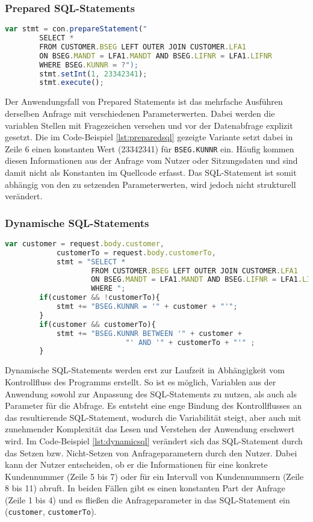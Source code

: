 \subsubsection{Prepared SQL-Statements}

	\begin{lstlisting}[caption={Prepared Statements eingebettet im Quellcode}, label={lst:preparedsql}, language=JavaScript]
		var stmt = con.prepareStatement("
		SELECT *
		FROM CUSTOMER.BSEG LEFT OUTER JOIN CUSTOMER.LFA1
		ON BSEG.MANDT = LFA1.MANDT AND BSEG.LIFNR = LFA1.LIFNR
		WHERE BSEG.KUNNR = ?");
		stmt.setInt(1, 23342341);
		stmt.execute();
	\end{lstlisting}

Der Anwendungsfall von Prepared Statements ist das mehrfache Ausführen derselben Anfrage mit verschiedenen Parameterwerten.
Dabei werden die variablen Stellen mit Fragezeichen versehen und vor der Datenabfrage explizit gesetzt.
Die im Code-Beispiel \ref{lst:preparedsql} gezeigte Variante setzt dabei in Zeile 6 einen konstanten Wert (23342341) für \texttt{BSEG.KUNNR} ein.
Häufig kommen diesen Informationen aus der Anfrage vom Nutzer oder Sitzungsdaten und sind damit nicht als Konstanten im Quellcode erfasst.
Das SQL-Statement ist somit abhängig von den zu setzenden Parameterwerten, wird jedoch nicht strukturell verändert.

\subsubsection{Dynamische SQL-Statements}

	\begin{lstlisting}[caption={Der Kontrollfluss verändert dynamische SQL-Statements}, label={lst:dynamicsql}, language=JavaScript]
		var customer = request.body.customer,
		    customerTo = request.body.customerTo,
		    stmt = "SELECT *
					FROM CUSTOMER.BSEG LEFT OUTER JOIN CUSTOMER.LFA1
					ON BSEG.MANDT = LFA1.MANDT AND BSEG.LIFNR = LFA1.LIFNR
					WHERE ";
		if(customer && !customerTo){
			stmt += "BSEG.KUNNR = '" + customer + "'";
		}
		if(customer && customerTo){
			stmt += "BSEG.KUNNR BETWEEN '" + customer +
							"' AND '" + customerTo + "'" ;
		}
	\end{lstlisting}

Dynamische SQL-Statements werden erst zur Laufzeit in Abhängigkeit vom Kontrollfluss des Programms erstellt.
So ist es möglich, Variablen aus der Anwendung sowohl zur Anpassung des SQL-Statements zu nutzen, als auch als Parameter für die Abfrage.
Es entsteht eine enge Bindung des Kontrollflusses an das resultierende SQL-Statement, wodurch die Variabilität steigt, aber auch mit zunehmender Komplexität das Lesen und Verstehen der Anwendung erschwert wird.
Im Code-Beispiel \ref{lst:dynamicsql} verändert sich das SQL-Statement durch das Setzen bzw. Nicht-Setzen von Anfrageparametern durch den Nutzer.
Dabei kann der Nutzer entscheiden, ob er die Informationen für eine konkrete Kundennummer (Zeile 5 bis 7) oder für ein Intervall von Kundennummern (Zeile 8 bis 11) abruft.
In beiden Fällen gibt es einen konstanten Part der Anfrage (Zeile 1 bis 4) und es fließen die Anfrageparameter in das SQL-Statement ein (\texttt{customer}, \texttt{customerTo}).

